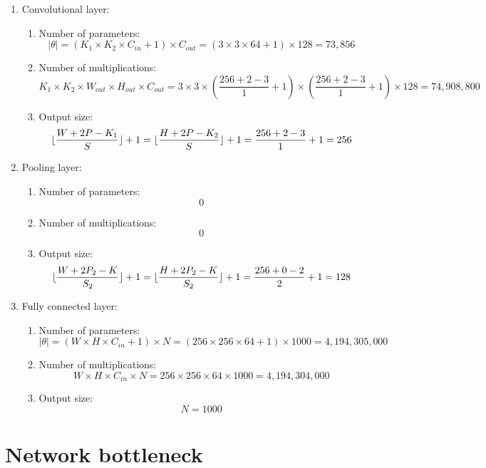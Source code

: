 \documentclass[a4paper]{article}
\DeclarePairedDelimiter\floor{\lfloor}{\rfloor}
\begin{document}
\begin{enumerate}
    \item Convolutional layer:
        \begin{enumerate}
            \item Number of parameters:
            $$|\theta| = (K_1 \times K_2 \times C_{in} + 1) \times C_{out} = (3 \times 3 \times 64 + 1) \times 128 = 73,856$$
            \item Number of multiplications:
            $$K_1 \times K_2 \times W_{out} \times H_{out} \times C_{out} = 3 \times 3 \times (\frac{256 + 2 - 3}{1} + 1) \times (\frac{256 + 2 - 3}{1} + 1) \times 128 = 74,908,800$$
            \item Output size:
            $$\floor{\frac{W + 2P - K_1}{S}} + 1 = \floor{\frac{H + 2P - K_2}{S}} + 1 = \frac{256 + 2 - 3}{1} + 1 = 256$$
        \end{enumerate}
    \item Pooling layer:
        \begin{enumerate}
            \item Number of parameters:
            $$0$$
            \item Number of multiplications:
            $$0$$
            \item Output size:
            $$\floor{\frac{W + 2P_2 - K}{S_2}} + 1 = \floor{\frac{H + 2P_2 - K}{S_2}} + 1 = \frac{256 + 0 - 2}{2} + 1 = 128$$
        \end{enumerate}
    \item Fully connected layer:
        \begin{enumerate}
            \item Number of parameters:
            $$|\theta| = (W \times H \times C_{in} + 1) \times N = (256 \times 256 \times 64 + 1) \times 1000 = 4,194,305,000$$
            \item Number of multiplications:
            $$W \times H \times C_{in} \times N = 256 \times 256 \times 64 \times 1000 = 4,194,304,000$$
            \item Output size:
            $$N = 1000$$
        \end{enumerate}
\end{enumerate}

\section{Network bottleneck}
\end{document}
